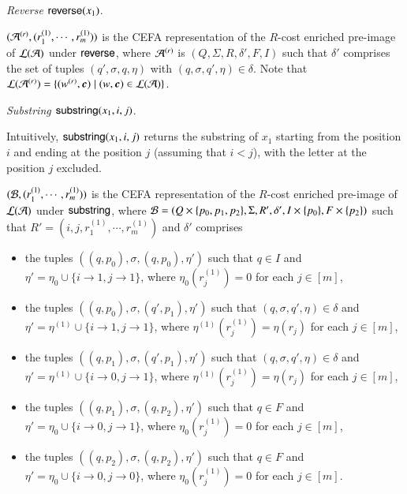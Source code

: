 \documentclass{llncs}
\begin{document}
\smallskip 

\noindent \emph{Reverse $\mathsf{reverse}(x_1)$}. 

$(\mathcal{A}^{(r)}, (r^{(1)}_1, \cdots, r^{(1)}_m))$ is the CEFA representation of the $R$-cost enriched pre-image of $\mathcal{L}(\mathcal{A})$ under $\mathsf{reverse}$, where $\mathcal{A}^{(r)}$ is $(Q, \Sigma, R, \delta', F, I)$ such that $\delta'$ comprises the set of tuples $(q', \sigma, q, \eta)$ with  $(q, \sigma, q', \eta) \in \delta$. Note that $\Lang(\Aut^{(r)}) = \{(w^{(r)}, \vec{c}) \mid (w, \vec{c}) \in \Lang(\Aut)\}$.


\smallskip

\noindent \emph{Substring $\mathsf{substring}(x_1, i, j)$}.

Intuitively, $\mathsf{substring}(x_1, i, j)$ returns the substring of $x_1$ starting from the position $i$ and ending at the position $j$ (assuming that $i  < j$), with the letter at the position $j$ excluded.

$(\mathcal{B}, (r^{(1)}_1, \cdots, r^{(1)}_m))$ is the CEFA representation of the $R$-cost enriched pre-image of $\mathcal{L}(\mathcal{A})$ under $\mathsf{substring}$, where $\mathcal{B} = (Q \times \{p_0, p_1, p_2\}, \Sigma, R', \delta', I \times \{p_0\}, F \times \{p_2\})$ such that $R' = (i, j, r^{(1)}_1,\cdots, r^{(1)}_m)$ and $\delta'$ comprises 
\begin{itemize}
\item the tuples $((q, p_0), \sigma, (q, p_0), \eta')$ such that $q \in I$ and $\eta' = \eta_0 \cup \{i \rightarrow 1, j \rightarrow 1\}$, where $\eta_0(r^{(1)}_j)=0$ for each $j \in [m]$,
%
\item the tuples $((q, p_0), \sigma, (q', p_1), \eta')$ such that $(q, \sigma, q', \eta) \in \delta$ and $\eta' = \eta^{(1)} \cup \{i \rightarrow 1, j  \rightarrow 1\}$, where $\eta^{(1)}(r^{(1)}_j)=\eta(r_j)$ for each $j \in [m]$,
%
\item the tuples $((q, p_1), \sigma, (q', p_1), \eta')$ such that $(q, \sigma, q', \eta) \in \delta$ and $\eta' = \eta^{(1)} \cup \{i \rightarrow 0, j  \rightarrow 1\}$, where $\eta^{(1)}(r^{(1)}_j)=\eta(r_j)$ for each $j \in [m]$,
%
\item the tuples $((q, p_1), \sigma, (q, p_2), \eta')$ such that $q \in F$ and $\eta' = \eta_0 \cup \{i \rightarrow 0, j  \rightarrow 1\}$, where $\eta_0(r^{(1)}_j)=0$ for each $j \in [m]$,
%
\item the tuples $((q, p_2), \sigma, (q, p_2), \eta')$ such that $q \in F$ and $\eta' = \eta_0 \cup \{i \rightarrow 0, j  \rightarrow 0\}$, where $\eta_0(r^{(1)}_j)=0$ for each $j \in [m]$.
%
\end{itemize}
%
\end{document}
